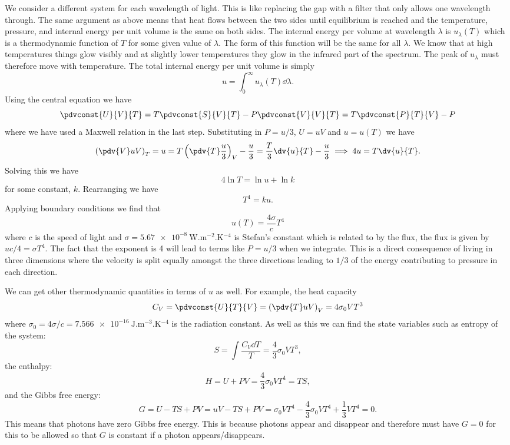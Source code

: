     We consider a different system for each wavelength of light.
    This is like replacing the gap with a filter that only allows one wavelength through.
    The same argument as above means that heat flows between the two sides until equilibrium is reached and the temperature, pressure, and internal energy per unit volume is the same on both sides.
    The internal energy per volume at wavelength \(\lambda\) is \(u_\lambda(T)\) which is a thermodynamic function of \(T\) for some given value of \(\lambda\).
    The form of this function will be the same for all \(\lambda\).
    We know that at high temperatures things glow visibly and at slightly lower temperatures they glow in the infrared part of the spectrum.
    The peak of \(u_\lambda\) must therefore move with temperature.
    The total internal energy per unit volume is simply
    \[u = \int_{0}^{\infty} u_\lambda(T)\dd{\lambda}.\]
    Using the central equation we have
    \[\pdvconst{U}{V}{T} = T\pdvconst{S}{V}{T} - P\pdvconst{V}{V}{T} = T\pdvconst{P}{T}{V} - P\]
    where we have used a Maxwell relation in the last step.
    Substituting in \(P = u/3\), \(U = uV\) and \(u = u(T)\) we have
    \[\left(\pdv{V}uV\right)_T = u = T\left(\pdv{T}\frac{u}{3}\right)_V - \frac{u}{3} = \frac{T}{3}\dv{u}{T} - \frac{u}{3} \implies 4u = T\dv{u}{T}.\]
    Solving this we have
    \[4\ln T = \ln u + \ln k\]
    for some constant, \(k\).
    Rearranging we have
    \[T^4 = ku.\]
    Applying boundary conditions we find that
    \[u(T) = \frac{4\sigma}{c}T^4\]
    where \(c\) is the speed of light and \(\sigma = \SI{5.67e-8}{\watt.\meter^{-2}.\kelvin^{-4}}\) is Stefan's constant which is related to by the flux, the flux is given by \(uc/4 = \sigma T^4\).
    The fact that the exponent is 4 will lead to terms like \(P = u/3\) when we integrate.
    This is a direct consequence of living in three dimensions where the velocity is split equally amongst the three directions leading to \(1/3\) of the energy contributing to pressure in each direction.
    
    We can get other thermodynamic quantities in terms of \(u\) as well.
    For example, the heat capacity
    \[C_V = \pdvconst{U}{T}{V} = \left(\pdv{T}uV\right)_V = 4\sigma_0VT^3\]
    where \(\sigma_0 = 4\sigma/c = \SI{7.566e-16}{\joule.\meter^{-3}.\kelvin^{-4}}\) is the radiation constant.
    As well as this we can find the state variables such as entropy of the system:
    \[S = \int \frac{C_V\dd{T}}{T} = \frac{4}{3}\sigma_0VT^3,\]
    the enthalpy:
    \[H = U + PV = \frac{4}{3}\sigma_0VT^4 = TS,\]
    and the Gibbs free energy:
    \[G = U - TS + PV = uV - TS + PV = \sigma_0VT^4 - \frac{4}{3}\sigma_0VT^4 + \frac{1}{3}VT^4 = 0.\]
    This means that photons have zero Gibbs free energy.
    This is because photons appear and disappear and therefore must have \(G = 0\) for this to be allowed so that \(G\) is constant if a photon appears/disappears.
    
